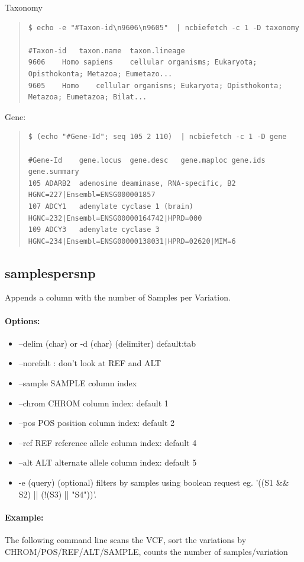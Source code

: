 \documentclass[12pt]{article}
\begin{document}
Taxonomy
\begin{quote}
\begin{verbatim}
$ echo -e "#Taxon-id\n9606\n9605"  | ncbiefetch -c 1 -D taxonomy

#Taxon-id	taxon.name	taxon.lineage
9606	Homo sapiens	cellular organisms; Eukaryota; Opisthokonta; Metazoa; Eumetazo...
9605	Homo	cellular organisms; Eukaryota; Opisthokonta; Metazoa; Eumetazoa; Bilat...
\end{verbatim}
\end{quote}

Gene:
\begin{quote}
\begin{verbatim}
$ (echo "#Gene-Id"; seq 105 2 110)  | ncbiefetch -c 1 -D gene

#Gene-Id	gene.locus	gene.desc	gene.maploc	gene.ids	gene.summary
105	ADARB2	adenosine deaminase, RNA-specific, B2		HGNC=227|Ensembl=ENSG000001857
107	ADCY1	adenylate cyclase 1 (brain)		HGNC=232|Ensembl=ENSG00000164742|HPRD=000
109	ADCY3	adenylate cyclase 3		HGNC=234|Ensembl=ENSG00000138031|HPRD=02620|MIM=6
\end{verbatim}
\end{quote}

\subsection{samplespersnp}
Appends a column with the number of Samples per Variation.
\paragraph{Options:}
\begin{itemize}
\item--delim (char) or -d  (char) (delimiter) default:tab
\item--norefalt : don't look at REF and ALT
\item--sample SAMPLE column index
\item--chrom CHROM column index: default 1
\item--pos POS position column index: default 2
\item--ref REF reference allele column index: default 4
\item--alt ALT alternate allele column index: default 5
\item-e (query) (optional) filters by samples using boolean request eg. '((S1 \&\& S2) || (!(S3) || "S4"))'.
\end{itemize}
\paragraph{Example:}
The following command line scans the VCF, sort the variations by CHROM/POS/REF/ALT/SAMPLE, counts the number of samples/variation 
\end{document}
